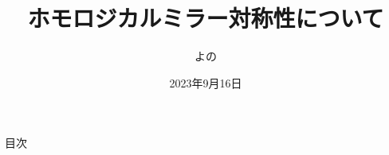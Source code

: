 \documentclass[aspectratio=169, dvipdfmx, 8pt, notheorems, uplatex]{beamer}
\title[]{ホモロジカルミラー対称性について}
\subtitle{}
\author[2023年度 数学徒のつどい オンライン]{よの}
\date{2023年9月16日}
\begin{document}
\maketitle

\begin{frame}{目次}
  \tableofcontents
\end{frame}






\end{document}
